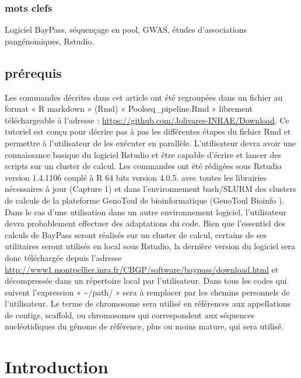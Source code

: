 \documentclass[
  openany]{book}
\theoremstyle{definition}
\theoremstyle{definition}
\theoremstyle{definition}
\theoremstyle{definition}
\theoremstyle{remark}
\begin{document}
\hypertarget{mots-clefs-1}{%
\subsection*{mots clefs}\label{mots-clefs-1}}

Logiciel BayPass, séquençage en pool, GWAS, études d'associations pangénomiques, Rstudio.

\hypertarget{pruxe9requis-1}{%
\section*{prérequis}\label{pruxe9requis-1}}

Les commandes décrites dans cet article ont été regroupées dans un fichier au format « R markdown » (Rmd) « Poolseq\_pipeline.Rmd » librement téléchargeable à l'adresse : \url{https://github.com/Jolivares-INRAE/Download}. Ce tutoriel est conçu pour décrire pas à pas les différentes étapes du fichier Rmd et permettre à l'utilisateur de les exécuter en parallèle.
L'utilisateur devra avoir une connaissance basique du logiciel Rstudio et être capable d'écrire et lancer des scripts sur un cluster de calcul.
Les commandes ont été rédigées sous Rstudio version 1.4.1106 couplé à R 64 bits version 4.0.5. avec toutes les librairies nécessaires à jour (Capture 1) et dans l'environnement bash/SLURM des clusters de calculs de la plateforme GenoToul de bioinformatique (GenoToul Bioinfo ). Dans le cas d'une utilisation dans un autre environnement logiciel, l'utilisateur devra probablement effectuer des adaptations du code.
Bien que l'essentiel des calculs de BayPass seront réalisés sur un cluster de calcul, certains de ses utilitaires seront utilisés en local sous Rstudio, la dernière version du logiciel sera donc téléchargée depuis l'adresse \url{http://www1.montpellier.inra.fr/CBGP/software/baypass/download.html} et décompressée dans un répertoire local par l'utilisateur.
Dans tous les codes qui suivent l'expression « \textasciitilde/path/ » sera à remplacer par les chemins personnels de l'utilisateur.
Le terme de chromosome sera utilisé en références aux appellations de contigs, scaffold, ou chromosomes qui correspondent aux séquences nucléotidiques du génome de référence, plus ou moins mature, qui sera utilisé.

\hypertarget{introduction}{%
\chapter*{Introduction}\label{introduction}}
\end{document}
